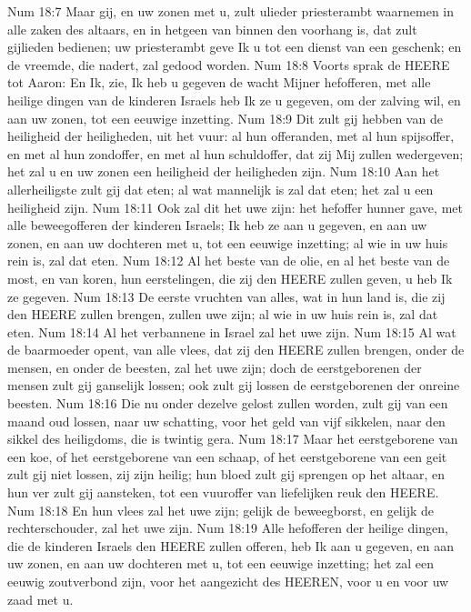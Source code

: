 Num 18:7  Maar gij, en uw zonen met u, zult ulieder priesterambt waarnemen in alle zaken des altaars, en in hetgeen van binnen den voorhang is, dat zult gijlieden bedienen; uw priesterambt geve Ik u tot een dienst van een geschenk; en de vreemde, die nadert, zal gedood worden.
Num 18:8  Voorts sprak de HEERE tot Aaron: En Ik, zie, Ik heb u gegeven de wacht Mijner hefofferen, met alle heilige dingen van de kinderen Israels heb Ik ze u gegeven, om der zalving wil, en aan uw zonen, tot een eeuwige inzetting.
Num 18:9  Dit zult gij hebben van de heiligheid der heiligheden, uit het vuur: al hun offeranden, met al hun spijsoffer, en met al hun zondoffer, en met al hun schuldoffer, dat zij Mij zullen wedergeven; het zal u en uw zonen een heiligheid der heiligheden zijn.
Num 18:10  Aan het allerheiligste zult gij dat eten; al wat mannelijk is zal dat eten; het zal u een heiligheid zijn.
Num 18:11  Ook zal dit het uwe zijn: het hefoffer hunner gave, met alle beweegofferen der kinderen Israels; Ik heb ze aan u gegeven, en aan uw zonen, en aan uw dochteren met u, tot een eeuwige inzetting; al wie in uw huis rein is, zal dat eten.
Num 18:12  Al het beste van de olie, en al het beste van de most, en van koren, hun eerstelingen, die zij den HEERE zullen geven, u heb Ik ze gegeven.
Num 18:13  De eerste vruchten van alles, wat in hun land is, die zij den HEERE zullen brengen, zullen uwe zijn; al wie in uw huis rein is, zal dat eten.
Num 18:14  Al het verbannene in Israel zal het uwe zijn.
Num 18:15  Al wat de baarmoeder opent, van alle vlees, dat zij den HEERE zullen brengen, onder de mensen, en onder de beesten, zal het uwe zijn; doch de eerstgeborenen der mensen zult gij ganselijk lossen; ook zult gij lossen de eerstgeborenen der onreine beesten.
Num 18:16  Die nu onder dezelve gelost zullen worden, zult gij van een maand oud lossen, naar uw schatting, voor het geld van vijf sikkelen, naar den sikkel des heiligdoms, die is twintig gera.
Num 18:17  Maar het eerstgeborene van een koe, of het eerstgeborene van een schaap, of het eerstgeborene van een geit zult gij niet lossen, zij zijn heilig; hun bloed zult gij sprengen op het altaar, en hun ver zult gij aansteken, tot een vuuroffer van liefelijken reuk den HEERE.
Num 18:18  En hun vlees zal het uwe zijn; gelijk de beweegborst, en gelijk de rechterschouder, zal het uwe zijn.
Num 18:19  Alle hefofferen der heilige dingen, die de kinderen Israels den HEERE zullen offeren, heb Ik aan u gegeven, en aan uw zonen, en aan uw dochteren met u, tot een eeuwige inzetting; het zal een eeuwig zoutverbond zijn, voor het aangezicht des HEEREN, voor u en voor uw zaad met u.
